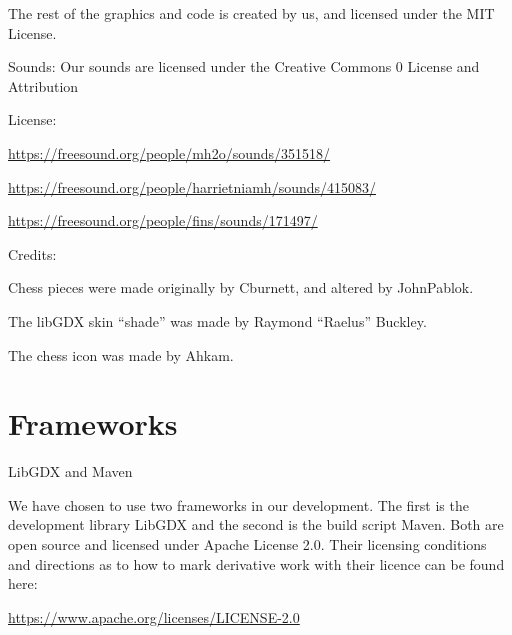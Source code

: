 \documentclass[a4paper, 11pt]{article}
\begin{document}
\vspace{1mm}
\noindent
The rest of the graphics and code is created by us, and licensed under the MIT License. 

\vspace{7mm}
\noindent
Sounds: 
Our sounds are licensed under the Creative Commons 0 License and Attribution

\noindent
License:

\vspace{3mm}
\noindent
\url{https://freesound.org/people/mh2o/sounds/351518/}

\vspace{3mm}
\noindent
\url{https://freesound.org/people/harrietniamh/sounds/415083/}

\vspace{3mm}
\noindent
\url{https://freesound.org/people/fins/sounds/171497/}




\vspace{7mm}
\noindent
Credits:

\noindent
Chess pieces were made originally by Cburnett, and altered by JohnPablok.

\noindent
The libGDX skin “shade” was made by Raymond “Raelus” Buckley. 

\noindent
The chess icon was made by Ahkam.

\vspace{10mm}

\section*{Frameworks}
LibGDX and Maven

\vspace{6mm}
\noindent
We have chosen to use two frameworks in our development. The first is the development library LibGDX and the second is the build script Maven. Both are open source and licensed under Apache License 2.0. Their licensing conditions and directions as to how to mark derivative work with their licence can be found here: 

\vspace{5 mm}
\noindent
\url{https://www.apache.org/licenses/LICENSE-2.0}
\end{document}
